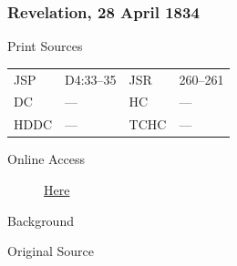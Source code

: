 		\subsubsection{Revelation, 28 April 1834}
			\label{EMS-1834-JS-28-APR-1834}
			
			\begin{description}
					\item[Print Sources]
				\end{description}

					\begin{tabular}{p{0.5in}p{1in}p{0.5in}p{1in}}
					JSP	 	& D4:33--35			& JSR 		& 260--261 \\
					DC	 	& --- 				& HC 		& --- \\
					HDDC 	& ---				& TCHC 		& --- \\
					\end{tabular}
				
				\begin{description}
					\item[Online Access] \href{https://www.josephsmithpapers.org/paper-summary/revelation-28-april-1834/1}{Here}
				\end{description}
				
				\begin{description}
					\item[Background]
				\end{description}
				
				
				\begin{description}
					\item[Original Source]
				\end{description}
				
				
